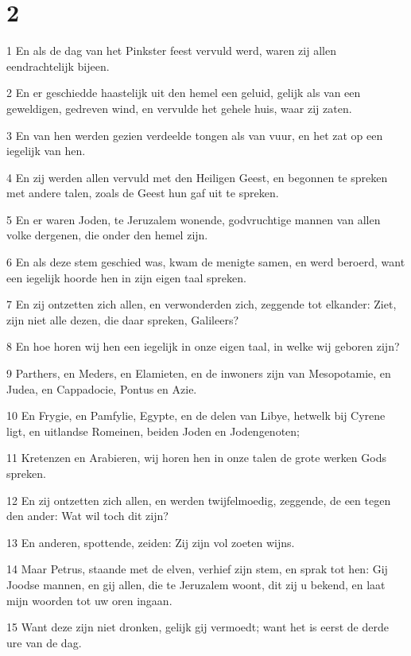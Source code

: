 \chapter{2}

\par 1 En als de dag van het Pinkster feest vervuld werd, waren zij allen eendrachtelijk bijeen.
\par 2 En er geschiedde haastelijk uit den hemel een geluid, gelijk als van een geweldigen, gedreven wind, en vervulde het gehele huis, waar zij zaten.
\par 3 En van hen werden gezien verdeelde tongen als van vuur, en het zat op een iegelijk van hen.
\par 4 En zij werden allen vervuld met den Heiligen Geest, en begonnen te spreken met andere talen, zoals de Geest hun gaf uit te spreken.
\par 5 En er waren Joden, te Jeruzalem wonende, godvruchtige mannen van allen volke dergenen, die onder den hemel zijn.
\par 6 En als deze stem geschied was, kwam de menigte samen, en werd beroerd, want een iegelijk hoorde hen in zijn eigen taal spreken.
\par 7 En zij ontzetten zich allen, en verwonderden zich, zeggende tot elkander: Ziet, zijn niet alle dezen, die daar spreken, Galileers?
\par 8 En hoe horen wij hen een iegelijk in onze eigen taal, in welke wij geboren zijn?
\par 9 Parthers, en Meders, en Elamieten, en de inwoners zijn van Mesopotamie, en Judea, en Cappadocie, Pontus en Azie.
\par 10 En Frygie, en Pamfylie, Egypte, en de delen van Libye, hetwelk bij Cyrene ligt, en uitlandse Romeinen, beiden Joden en Jodengenoten;
\par 11 Kretenzen en Arabieren, wij horen hen in onze talen de grote werken Gods spreken.
\par 12 En zij ontzetten zich allen, en werden twijfelmoedig, zeggende, de een tegen den ander: Wat wil toch dit zijn?
\par 13 En anderen, spottende, zeiden: Zij zijn vol zoeten wijns.
\par 14 Maar Petrus, staande met de elven, verhief zijn stem, en sprak tot hen: Gij Joodse mannen, en gij allen, die te Jeruzalem woont, dit zij u bekend, en laat mijn woorden tot uw oren ingaan.
\par 15 Want deze zijn niet dronken, gelijk gij vermoedt; want het is eerst de derde ure van de dag.
